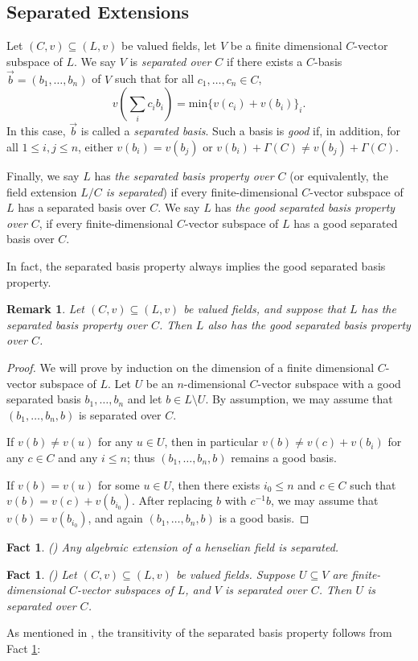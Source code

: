\documentclass[12pt]{article}
\newcommand{\minn}{\mathrm{min}}
\newcommand{\val}{\textit{v}}
\newcommand{\0}{\emptyset}
\theoremstyle{plain}%
\newtheorem{rem}[thm]{Remark}
\newtheorem{fact}[thm]{Fact}
\theoremstyle{definition}
\theoremstyle{remark}
\begin{document}
\subsection{Separated Extensions} Let $(C,v)\subseteq (L,v)$ be valued fields, let $V$ be a finite dimensional $C$-vector subspace of $L$. We say $V$ is \textit{separated over $C$} if there exists a $C$-basis $\vec{b}=(b_1,\dots,b_n)$ of $V$ such that for all $c_1,\dots,c_n \in C$, $$\val(\underset{i}{\sum}c_ib_i)=\minn\lbrace v(c_i)+v(b_i)\rbrace_{i}.$$
In this case, $\vec{b}$ is called a \textit{separated basis}. Such a basis is \textit{good} if, in addition, for all $1\leq i,j\leq n$, either $\val(b_i)=v(b_j)$ or $v(b_i)+\Gamma(C)\not=\val(b_j)+\Gamma(C).$ 

    Finally, we say $L$ has \textit{the separated basis property over $C$} (or equivalently, the field extension \textit {$L/C$
is separated}) if every finite-dimensional $C$-vector subspace of $L$ has a separated basis over $C$. We say $L$ has \textit{the good separated basis property over} $C$, if every finite-dimensional $C$-vector subspace of $L$ has a good separated basis over $C$.

In fact, the separated basis property always implies the good separated basis property.
\begin{rem}\label{separatedness_implies_good}
Let $(C,\val)\subseteq (L,\val)$ be valued fields, and suppose that $L$ has the separated basis property over $C$. Then $L$ also has the good separated basis property over $C$.
\end{rem}
\begin{proof} We will prove by induction on the dimension of a finite dimensional $C$-vector subspace of $L$. Let $U$ be an $n$-dimensional $C$-vector subspace with a good separated basis $b_1, \dots, b_n$ and let $b \in L \setminus U$. By assumption, we may assume that $(b_1, \dots, b_n, b)$ is separated over $C$. 

If $\val(b) \not= \val(u)$ for any $u \in U$, then in particular $\val(b) \ne \val(c) + \val(b_i)$ for any $c \in C$ and any $i \leq n$; thus $(b_1, \dots, b_n, b)$ remains a good basis. 

If $\val(b) = \val(u)$ for some $u \in U$, then there exists $i_0 \leq n$ and $c \in C$ such that $\val(b) = \val(c) + \val(b_{i_0})$. After replacing $b$ with $c^{-1}b$, we may assume that $\val(b) = \val(b_{i_0})$, and again $(b_1, \dots, b_n, b)$ is a good basis. \end{proof}


\begin{fact}\label{Delon2}(\cite[Corollary 7]{Del88}) Any algebraic extension of a henselian field is separated.
    
\end{fact}
\begin{fact}\label{Delon1}(\cite[Lemma 5]{Del88}) Let $(C,v)\subseteq (L,v)$ be valued fields. Suppose $U\subseteq V$ are finite-dimensional $C$-vector subspaces of $L$, and $V$ is separated over $C$. Then $U$ is separated over $C$.
\end{fact}
As mentioned in \cite{Del88}, the transitivity of the separated basis property follows from Fact \ref{Delon1}:
\end{document}
